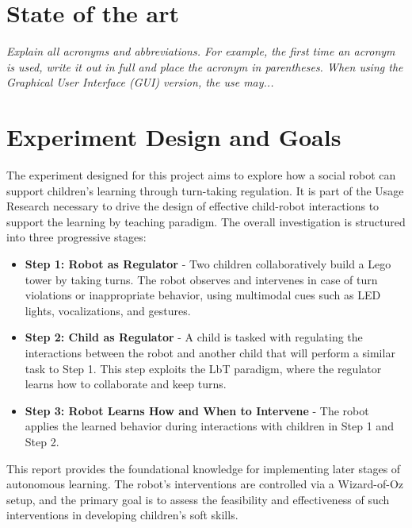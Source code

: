 \documentclass[a4paper]{usiinfbachelorproject}
\begin{document}
\section{\textbf{State of the art}}\label{sec:background}
\textit{
    Explain all acronyms and abbreviations. For example, the first time an acronym is used, write it out in full and place the acronym in
    parentheses. When using the Graphical User Interface (GUI) version, the use may...
}


\section{\textbf{Experiment Design and Goals}}\label{sec:design}

The experiment designed for this project aims to explore how a social robot can support children's learning through turn-taking regulation. It is part of the Usage Research necessary to drive the design of effective child-robot interactions to support the learning by teaching paradigm. The overall investigation is structured into three progressive stages:

\begin{itemize}
    \item \textbf{Step 1: Robot as Regulator} - Two children collaboratively build a Lego tower by taking turns. The robot observes and intervenes in case of turn violations or inappropriate behavior, using multimodal cues such as LED lights, vocalizations, and gestures.
    \item \textbf{Step 2: Child as Regulator} - A child is tasked with regulating the interactions between the robot and another child that will perform a similar task to Step 1. This step exploits the LbT paradigm, where the regulator learns how to collaborate and keep turns.
    \item \textbf{Step 3: Robot Learns How and When to Intervene} - The robot applies the learned behavior during interactions with children in Step 1 and Step 2.
\end{itemize}

This report provides the foundational knowledge for implementing later stages of autonomous learning. The robot's interventions are controlled via a Wizard-of-Oz setup, and the primary goal is to assess the feasibility and effectiveness of such interventions in developing children's soft skills.
\end{document}
